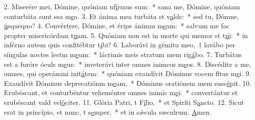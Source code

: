 2. Miserére mei, Dómine, quóniam nf\uline{í}rmus sum:~* sana me, Dómine, quóniam conturbáta sunt ssa m\uline{e}a.
3. Et ánima mea turbáta st v\uline{a}lde:~* sed tu, Dómne, \uline{ú}squequo?
4. Convértere, Dómine, et éripe ánimm m\uline{e}am:~* salvum me fac propter misericórdam t\uline{u}am.
5. Quóniam non est in morte qui memor st t\uline{u}i:~* in inférno autem quis confitébtur t\uline{i}bi?
6. Laborávi in gémitu meo,~† lavábo per síngulas noctes lectm m\uline{e}um:~* lácrimis meis stratum mem rig\uline{á}bo.
7. Turbátus est a furóre óculs m\uline{e}us:~* inveterávi inter omnes inimcos m\uline{e}os.
8. Discédite a me, omnes, qui operámini init\uline{á}tem:~* quóniam exaudívit Dóminus vocem fltus m\uline{e}i.
9. Exaudívit Dóminus deprecatiónm m\uline{e}am,~* Dóminus oratiónem mem susc\uline{é}pit.
10. Erubéscant, et conturbéntur veheménter omnes inimíc m\uline{e}i:~* convertántur et erubéscant vald vel\uline{ó}citer.
11. Glória Patri, t F\uline{í}lio,~* et Spiríti S\uline{a}ncto.
12. Sicut erat in princípio, et nunc, t s\uline{e}mper,~* et in sǽcula sæculrum. \uline{A}men.
